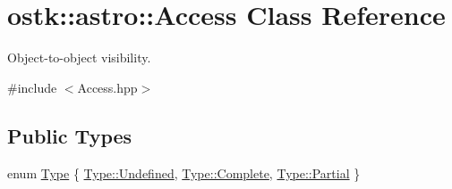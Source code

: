 \hypertarget{classostk_1_1astro_1_1_access}{}\section{ostk\+:\+:astro\+:\+:Access Class Reference}
\label{classostk_1_1astro_1_1_access}


Object-\/to-\/object visibility.  




{\ttfamily \#include $<$Access.\+hpp$>$}

\subsection*{Public Types}
\begin{DoxyCompactItemize}
\item 
enum \hyperlink{classostk_1_1astro_1_1_access_aac00b1a6ead7db92eba5b71e43235c93}{Type} \{ \hyperlink{classostk_1_1astro_1_1_access_aac00b1a6ead7db92eba5b71e43235c93aec0fc0100c4fc1ce4eea230c3dc10360}{Type\+::\+Undefined}, 
\hyperlink{classostk_1_1astro_1_1_access_aac00b1a6ead7db92eba5b71e43235c93aae94f80b3ce82062a5dd7815daa04f9d}{Type\+::\+Complete}, 
\hyperlink{classostk_1_1astro_1_1_access_aac00b1a6ead7db92eba5b71e43235c93a44ffd38a6dea695cbe2b34efdcc6cf27}{Type\+::\+Partial}
 \}
\end{DoxyCompactItemize}
